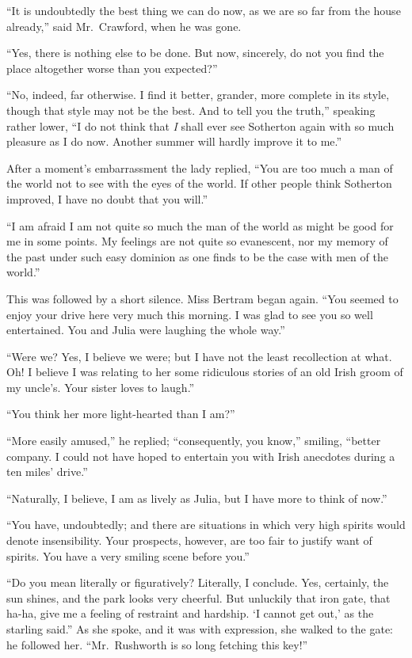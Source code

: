 ``It is undoubtedly the best thing we can do now, as we
are so far from the house already,'' said Mr.\ Crawford,
when he was gone.

``Yes, there is nothing else to be done.  But now, sincerely,
do not you find the place altogether worse than you expected?''

``No, indeed, far otherwise.  I find it better, grander, more
complete in its style, though that style may not be the best.
And to tell you the truth,'' speaking rather lower, ``I do not
think that \emph{I} shall ever see Sotherton again with so much
pleasure as I do now.  Another summer will hardly improve it to
me.''

After a moment's embarrassment the lady replied, ``You are
too much a man of the world not to see with the eyes
of the world.  If other people think Sotherton improved,
I have no doubt that you will.''

``I am afraid I am not quite so much the man of the world
as might be good for me in some points.  My feelings
are not quite so evanescent, nor my memory of the past
under such easy dominion as one finds to be the case
with men of the world.''

This was followed by a short silence.  Miss Bertram
began again.  ``You seemed to enjoy your drive here very much
this morning.  I was glad to see you so well entertained.
You and Julia were laughing the whole way.''

``Were we?  Yes, I believe we were; but I have not
the least recollection at what.  Oh!  I believe
I was relating to her some ridiculous stories
of an old Irish groom of my uncle's. Your sister loves to laugh.''

``You think her more light-hearted than I am?''

``More easily amused,'' he replied; ``consequently, you know,''
smiling, ``better company.  I could not have hoped
to entertain you with Irish anecdotes during a ten miles' drive.''

``Naturally, I believe, I am as lively as Julia, but I
have more to think of now.''

``You have, undoubtedly; and there are situations in
which very high spirits would denote insensibility.
Your prospects, however, are too fair to justify want
of spirits.  You have a very smiling scene before you.''

``Do you mean literally or figuratively?  Literally,
I conclude.  Yes, certainly, the sun shines, and the park
looks very cheerful.  But unluckily that iron gate,
that ha-ha, give me a feeling of restraint and hardship.
`I cannot get out,' as the starling said.''  As she spoke,
and it was with expression, she walked to the gate:
he followed her.  ``Mr.\ Rushworth is so long fetching
this key!''

